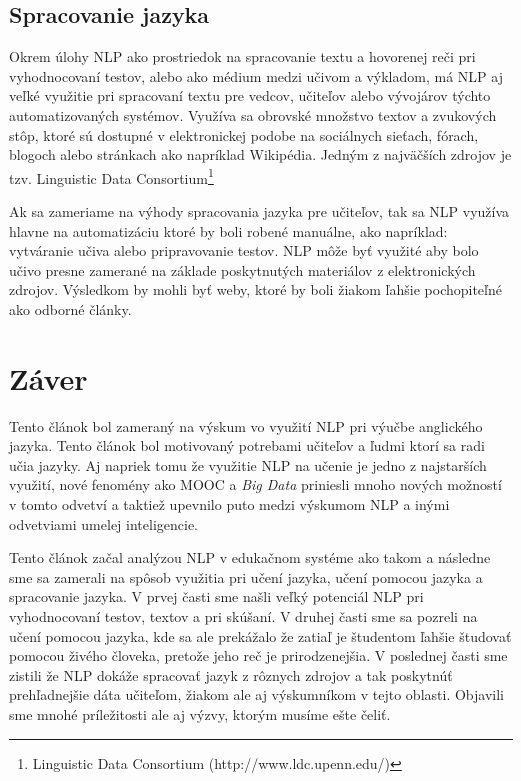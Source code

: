 \documentclass[10pt,slovak,a4paper,twoside]{article}
\begin{document}
\subsection{Spracovanie jazyka} \label{spracovanie_jazyka}
	Okrem úlohy NLP ako prostriedok na spracovanie textu a hovorenej reči pri vyhodnocovaní testov, 
	alebo ako médium medzi učivom a výkladom, má NLP aj veľké využitie pri spracovaní textu pre vedcov, 
	učiteľov alebo vývojárov týchto automatizovaných systémov. Využíva sa obrovské množstvo textov a zvukových
	stôp, ktoré sú dostupné v elektronickej podobe na sociálnych sieťach, fórach, blogoch alebo stránkach ako 
	napríklad Wikipédia. Jedným z najväčších zdrojov je tzv. Linguistic Data Consortium\footnote{Linguistic Data Consortium (http://www.ldc.upenn.edu/)}
	
	Ak sa zameriame na výhody spracovania jazyka pre učiteľov, tak sa NLP využíva hlavne na automatizáciu ktoré by boli robené manuálne, 
	ako napríklad: vytváranie učiva alebo pripravovanie testov. NLP môže byť využité aby bolo učivo presne zamerané na základe 
	poskytnutých materiálov z elektronických zdrojov. Výsledkom by mohli byť weby, ktoré by boli žiakom ľahšie pochopiteľné ako odborné články\cite{miltsakaki2009matching}.

\section{Záver} \label{zaver} %
	Tento článok bol zameraný na výskum vo využití NLP pri výučbe anglického jazyka. Tento článok bol motivovaný 
	potrebami učiteľov a ľudmi ktorí sa radi učia jazyky. Aj napriek tomu že využitie NLP na učenie je jedno z najstarších využití, 
	nové fenomény ako MOOC a \textit{Big Data} priniesli mnoho nových možností v tomto odvetví a taktiež upevnilo puto medzi výskumom NLP a inými 
	odvetviami umelej inteligencie.

	Tento článok začal analýzou NLP v edukačnom systéme ako takom a následne sme sa zamerali na spôsob využitia pri učení jazyka, 
	učení pomocou jazyka a spracovanie jazyka. V prvej časti sme našli veľký potenciál NLP pri vyhodnocovaní testov, textov a pri skúšaní.
	V druhej časti sme sa pozreli na učení pomocou jazyka, kde sa ale prekážalo že zatiaľ je študentom ľahšie študovať pomocou živého človeka, 
	pretože jeho reč je prirodzenejšia. V poslednej časti sme zistili že NLP dokáže spracovať jazyk z rôznych zdrojov a tak poskytnúť prehľadnejšie dáta
	učiteľom, žiakom ale aj výskumníkom v tejto oblasti. Objavili sme mnohé príležitosti ale aj výzvy, ktorým musíme ešte čeliť.
\end{document}
